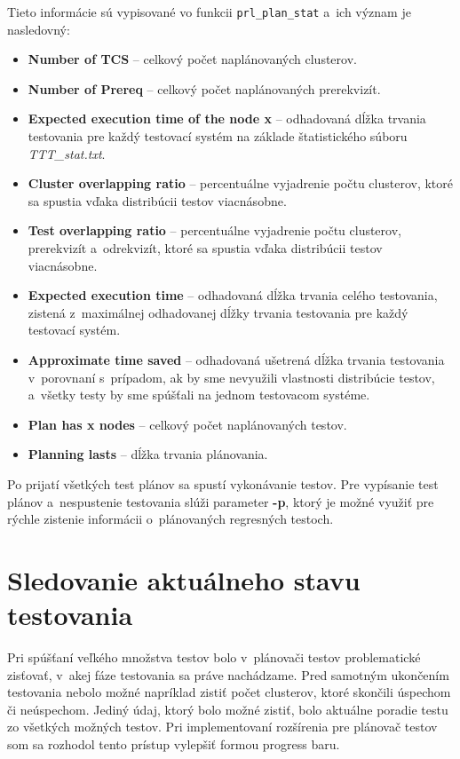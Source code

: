 \noindent Tieto informácie sú vypisované vo funkcii \texttt{prl\_plan\_stat} 
a~ich význam je nasledovný:
\begin{itemize}
\item \textbf{Number of TCS} -- celkový počet naplánovaných clusterov.
\item \textbf{Number of Prereq} -- celkový počet naplánovaných prerekvizít.
\item \textbf{Expected execution time of the node x} -- odhadovaná dĺžka
trvania testovania pre každý testovací systém na 
základe štatistického súboru \textit{TTT\_stat.txt}.
\item \textbf{Cluster overlapping ratio} -- percentuálne vyjadrenie počtu
clusterov, ktoré sa spustia vďaka distribúcii testov viacnásobne. 
\item \textbf{Test overlapping ratio} -- percentuálne vyjadrenie počtu
clusterov, prerekvizít a~odrekvizít, ktoré sa spustia vďaka 
distribúcii testov viacnásobne.
\item \textbf{Expected execution time} -- odhadovaná dĺžka
trvania celého testovania, zistená z~maximálnej odhadovanej dĺžky trvania
testovania pre každý testovací systém.
\item \textbf{Approximate time saved} -- odhadovaná ušetrená dĺžka trvania 
testovania v~porovnaní s~prípadom, ak by sme nevyužili vlastnosti distribúcie testov,
a~všetky testy by sme spúšťali na jednom testovacom systéme.
\item \textbf{Plan has x nodes} -- celkový počet naplánovaných testov.
\item \textbf{Planning lasts} -- dĺžka trvania plánovania.
\end{itemize}

Po prijatí všetkých test plánov sa spustí vykonávanie testov. 
Pre vypísanie test plánov a~nespustenie testovania slúži parameter 
\textbf{-p}, ktorý je možné využiť pre rýchle zistenie informácii 
o~plánovaných regresných testoch.


\section{Sledovanie aktuálneho stavu testovania}
\label{sekcia:sledovanie_stavu}
Pri spúšťaní veľkého množstva testov bolo v~plánovači testov problematické
zisťovať, v~akej fáze testovania sa práve nachádzame. 
Pred samotným ukončením testovania nebolo možné napríklad zistiť počet 
clusterov, ktoré skončili úspechom či neúspechom. 
Jediný údaj, ktorý bolo možné zistiť, bolo aktuálne poradie testu
zo všetkých možných testov.
Pri implementovaní rozšírenia pre plánovač testov som sa rozhodol tento
prístup vylepšiť formou progress baru.

